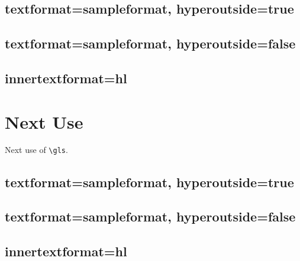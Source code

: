 \documentclass{report}
\begin{document}
\section{textformat=sampleformat, hyperoutside=true}

\glsresetall
{}

\section{textformat=sampleformat, hyperoutside=false}

\glsresetall
{}

\section{innertextformat=hl}

\glsresetall
{}

\chapter{Next Use}
Next use of \verb|\gls|.


\section{textformat=sampleformat, hyperoutside=true}


\section{textformat=sampleformat, hyperoutside=false}


\section{innertextformat=hl}
\end{document}

